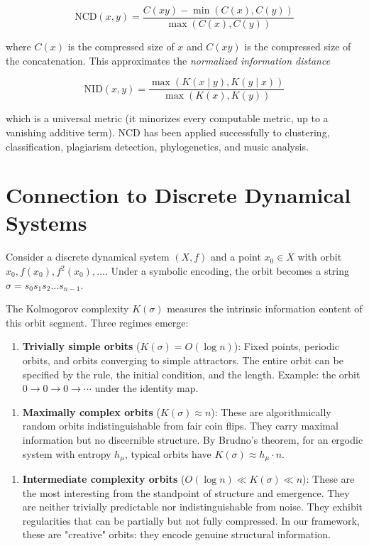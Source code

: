 \[\text{NCD}(x, y) = \frac{C(xy) - \min(C(x), C(y))}{\max(C(x), C(y))}\]

where $C(x)$ is the compressed size of $x$ and $C(xy)$ is the compressed size of the concatenation. This approximates the \textit{normalized information distance}

\[\text{NID}(x, y) = \frac{\max(K(x \mid y), K(y \mid x))}{\max(K(x), K(y))}\]

which is a universal metric (it minorizes every computable metric, up to a vanishing additive term). NCD has been applied successfully to clustering, classification, plagiarism detection, phylogenetics, and music analysis.



\section{Connection to Discrete Dynamical Systems}

Consider a discrete dynamical system $(X, f)$ and a point $x_0 \in X$ with orbit $x_0, f(x_0), f^2(x_0), \ldots$. Under a symbolic encoding, the orbit becomes a string $\sigma = s_0 s_1 s_2 \ldots s_{n-1}$.

The Kolmogorov complexity $K(\sigma)$ measures the intrinsic information content of this orbit segment. Three regimes emerge:

\begin{enumerate}
\item \textbf{Trivially simple orbits} ($K(\sigma) = O(\log n)$): Fixed points, periodic orbits, and orbits converging to simple attractors. The entire orbit can be specified by the rule, the initial condition, and the length. Example: the orbit $0 \to 0 \to 0 \to \cdots$ under the identity map.
\end{enumerate}

\begin{enumerate}
\item \textbf{Maximally complex orbits} ($K(\sigma) \approx n$): These are algorithmically random orbits indistinguishable from fair coin flips. They carry maximal information but no discernible structure. By Brudno's theorem, for an ergodic system with entropy $h_\mu$, typical orbits have $K(\sigma) \approx h_\mu \cdot n$.
\end{enumerate}

\begin{enumerate}
\item \textbf{Intermediate complexity orbits} ($O(\log n) \ll K(\sigma) \ll n$): These are the most interesting from the standpoint of structure and emergence. They are neither trivially predictable nor indistinguishable from noise. They exhibit regularities that can be partially but not fully compressed. In our framework, these are "creative" orbits: they encode genuine structural information.
\end{enumerate}

